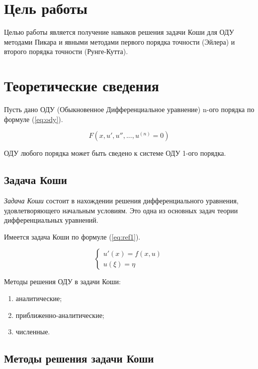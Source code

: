 \chapter*{Цель работы}
Целью работы является получение навыков решения задачи Коши для ОДУ методами Пикара и явными методами первого порядка точности (Эйлера) и второго порядка точности (Рунге-Кутта).

\newpage
\chapter{Теоретические сведения}

Пусть дано ОДУ (Обыкновенное Дифференциальное уравнение) n-ого порядка по формуле (\ref{eq:ody}).

\begin{equation}
	F(x, u', u'', ... , u^{(n)} = 0)
	\label{eq:ody}
\end{equation}

ОДУ любого порядка может быть сведено к системе ОДУ 1-ого порядка.

\section{Задача Коши}

\textit{Задача Коши} состоит в нахождении решения дифференциального уравнения, удовлетворяющего начальным условиям. 
Это одна из основных задач теории дифференциальных уравнений.

Имеется задача Коши по формуле (\ref{eq:ref1}).

\begin{equation}
	{\begin{cases}
			u'(x) = f(x,u) \\
			u(\xi) = \eta
	\end{cases}}
	\label{eq:ref1}
\end{equation}

Методы решения ОДУ в задачи Коши:

\begin{enumerate}
	\item аналитические;
	\item приближенно-аналитические;
	\item численные.
\end{enumerate}

\newpage
\section{Методы решения задачи Коши}


